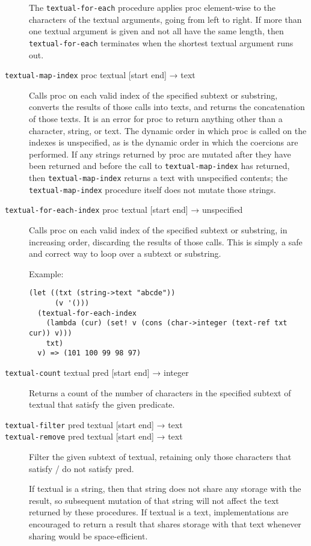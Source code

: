\begin{description}
The \texttt{textual-for-each} procedure applies proc element-wise to the
characters of the textual arguments, going from left to right. If more
than one textual argument is given and not all have the same length,
then \texttt{textual-for-each} terminates when the shortest textual
argument runs out.
\item[ \href{}{} \texttt{textual-map-index} proc textual {[}start end{]}
→ text ]
Calls proc on each valid index of the specified subtext or substring,
converts the results of those calls into texts, and returns the
concatenation of those texts. It is an error for proc to return anything
other than a character, string, or text. The dynamic order in which proc
is called on the indexes is unspecified, as is the dynamic order in
which the coercions are performed. If any strings returned by proc are
mutated after they have been returned and before the call to
\texttt{textual-map-index} has returned, then \texttt{textual-map-index}
returns a text with unspecified contents; the \texttt{textual-map-index}
procedure itself does not mutate those strings.
\item[ \href{}{} \texttt{textual-for-each-index} proc textual {[}start
end{]} → unspecified ]
Calls proc on each valid index of the specified subtext or substring, in
increasing order, discarding the results of those calls. This is simply
a safe and correct way to loop over a subtext or substring.

Example:

\begin{verbatim}
(let ((txt (string->text "abcde"))
      (v '()))
  (textual-for-each-index
    (lambda (cur) (set! v (cons (char->integer (text-ref txt cur)) v)))
    txt)
  v) => (101 100 99 98 97)
\end{verbatim}
\item[ \href{}{} \texttt{textual-count} textual pred {[}start end{]} →
integer ]
Returns a count of the number of characters in the specified subtext of
textual that satisfy the given predicate.
\item[ \href{}{} \href{}{} \texttt{textual-filter} pred textual {[}start
end{]} → text\\
\texttt{textual-remove} pred textual {[}start end{]} → text ]
Filter the given subtext of textual, retaining only those characters
that satisfy / do not satisfy pred.

If textual is a string, then that string does not share any storage with
the result, so subsequent mutation of that string will not affect the
text returned by these procedures. If textual is a text, implementations
are encouraged to return a result that shares storage with that text
whenever sharing would be space-efficient.
\end{description}


